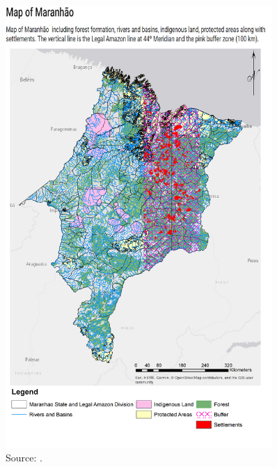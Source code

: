 \begin{figure}[H]
  \centering
  \includegraphics[width=0.9\textwidth, inner]{Settlements_title.png}
\caption{Source: \citep{MMMAwebsite,nugeo_2018,embrapa_2018, INCRA}.}
\label{fig:delimitacaosett}
\end{figure}



